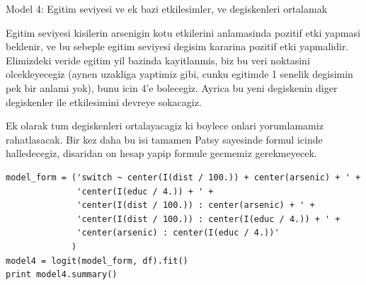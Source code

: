 \documentclass[12pt,fleqn]{article}\usepackage{../common}
\begin{document}
Model 4: Egitim seviyesi ve ek bazi etkilesimler, ve degiskenleri ortalamak

Egitim seviyesi kisilerin arsenigin kotu etkilerini anlamasinda
pozitif etki yapmasi beklenir, ve bu sebeple egitim seviyesi degisim
kararina pozitif etki yapmalidir. Elimizdeki veride egitim yil bazinda
kayitlanmis, biz bu veri noktasini olcekleyecegiz (aynen uzakliga
yaptimiz gibi, cunku egitimde 1 senelik degisimin pek bir anlami yok),
bunu icin 4'e bolecegiz. Ayrica bu yeni degiskenin diger degiskenler
ile etkilesimini devreye sokacagiz.

Ek olarak tum degiskenleri ortalayacagiz ki boylece onlari
yorumlamamiz rahatlasacak. Bir kez daha bu isi tamamen Patsy sayesinde
formul icinde halledecegiz, disaridan on hesap yapip formule gecmemiz
gerekmeyecek.

\begin{verbatim}
model_form = ('switch ~ center(I(dist / 100.)) + center(arsenic) + ' +
              'center(I(educ / 4.)) + ' +
              'center(I(dist / 100.)) : center(arsenic) + ' + 
              'center(I(dist / 100.)) : center(I(educ / 4.)) + ' + 
              'center(arsenic) : center(I(educ / 4.))'
             )
model4 = logit(model_form, df).fit()
print model4.summary()
\end{verbatim}
\end{document}

